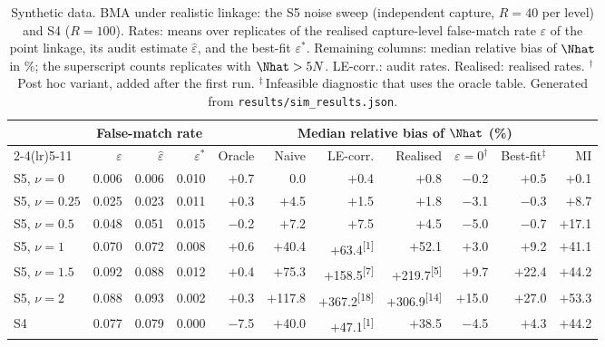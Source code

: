 \begin{table}[tp]
\centering
\caption{Synthetic data. BMA under realistic linkage: the S5 noise sweep (independent capture, $R=40$ per level) and S4 ($R=100$). Rates: means over replicates of the realised capture-level false-match rate $\varepsilon$ of the point linkage, its audit estimate $\hat\varepsilon$, and the best-fit $\varepsilon^\ast$. Remaining columns: median relative bias of $\Nhat$ in $\%$; the superscript counts replicates with $\Nhat>5N$. LE-corr.: audit rates. Realised: realised rates. $^\dagger$\,Post hoc variant, added after the first run. $^\ddagger$\,Infeasible diagnostic that uses the oracle table. Generated from \texttt{results/sim\_results.json}.}\label{tab:sim-realistic}
\small
\setlength{\tabcolsep}{4pt}
\begin{tabular}{@{}lrrrrrrrrrr@{}}
\toprule
 & \multicolumn{3}{c}{False-match rate} & \multicolumn{7}{c}{Median relative bias of $\Nhat$ (\%)} \\
\cmidrule(lr){2-4}\cmidrule(lr){5-11}
 & $\varepsilon$ & $\hat\varepsilon$ & $\varepsilon^\ast$ & Oracle & Naive & LE-corr. & Realised & $\varepsilon{=}0^\dagger$ & Best-fit$^\ddagger$ & MI \\
\midrule
S5, $\nu=0$ & 0.006 & 0.006 & 0.010 & $+$0.7 & $\phantom{+}$0.0 & $+$0.4 & $+$0.8 & $-$0.2 & $+$0.5 & $+$0.1 \\
S5, $\nu=0.25$ & 0.025 & 0.023 & 0.011 & $+$0.3 & $+$4.5 & $+$1.5 & $+$1.8 & $-$3.1 & $-$0.3 & $+$8.7 \\
S5, $\nu=0.5$ & 0.048 & 0.051 & 0.015 & $-$0.2 & $+$7.2 & $+$7.5 & $+$4.5 & $-$5.0 & $-$0.7 & $+$17.1 \\
S5, $\nu=1$ & 0.070 & 0.072 & 0.008 & $+$0.6 & $+$40.4 & $+$63.4\textsuperscript{[1]} & $+$52.1 & $+$3.0 & $+$9.2 & $+$41.1 \\
S5, $\nu=1.5$ & 0.092 & 0.088 & 0.012 & $+$0.4 & $+$75.3 & $+$158.5\textsuperscript{[7]} & $+$219.7\textsuperscript{[5]} & $+$9.7 & $+$22.4 & $+$44.2 \\
S5, $\nu=2$ & 0.088 & 0.093 & 0.002 & $+$0.3 & $+$117.8 & $+$367.2\textsuperscript{[18]} & $+$306.9\textsuperscript{[14]} & $+$15.0 & $+$27.0 & $+$53.3 \\
\addlinespace
S4 & 0.077 & 0.079 & 0.000 & $-$7.5 & $+$40.0 & $+$47.1\textsuperscript{[1]} & $+$38.5 & $-$4.5 & $+$4.3 & $+$44.2 \\
\bottomrule
\end{tabular}
\end{table}


